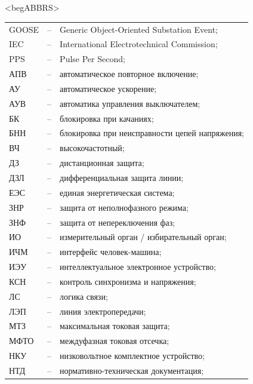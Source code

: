 \color{unimain}\section*{}
{\color{white}\fontsize{0.1pt}{0.1pt}\selectfont<begABBRS>}
\color{black}
\begin{longtable}{>{\raggedright\arraybackslash}m{2cm}>{\raggedright\arraybackslash}m{0.5cm}>{\raggedright\arraybackslash}m{20cm}}
\endfirsthead\endhead\endfoot\endlastfoot
GOOSE & -- & Generic Object-Oriented Substation Event; \\
IEC & -- &  International Electrotechnical Commission; \\
PPS & -- & Pulse Per Second; \\
АПВ & -- & автоматическое повторное включение; \\
АУ & -- & автоматическое ускорение; \\
АУВ & -- & автоматика управления выключателем; \\
БК & -- & блокировка при качаниях; \\
БНН & -- & блокировка при неисправности цепей напряжения; \\
ВЧ & -- & высокочастотный; \\
ДЗ & -- & дистанционная защита; \\
ДЗЛ & -- & дифференциальная защита линии; \\
ЕЭС & -- & единая энергетическая система; \\
ЗНР & -- & защита от неполнофазного режима; \\
ЗНФ & -- & защита от непереключения фаз; \\
ИО & -- & измерительный орган / избирательный орган; \\
ИЧМ & -- & интерфейс человек-машина; \\
ИЭУ & -- & интеллектуальное электронное устройство; \\
КСН & -- & контроль синхронизма и напряжения; \\
ЛС & -- & логика связи; \\
ЛЭП & -- & линия электропередачи; \\
МТЗ & -- & максимальная токовая защита; \\
МФТО & -- & междуфазная токовая отсечка; \\
НКУ & -- & низковольтное комплектное устройство; \\
НТД & -- & нормативно-техническая документация; \\

\end{longtable}
